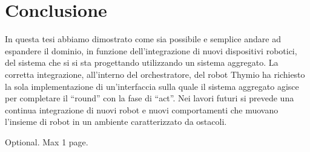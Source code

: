 \documentclass[12pt,a4paper,openright,twoside]{book}
\begin{document}
\chapter{Conclusione}
\label{chap:conclusione}

In questa tesi abbiamo dimostrato come sia possibile e semplice andare ad espandere il dominio, in funzione dell'integrazione di nuovi dispositivi robotici, del sistema che si si sta progettando utilizzando un sistema aggregato. La corretta integrazione, all'interno del orchestratore, del robot Thymio ha richiesto la sola implementazione di un'interfaccia sulla quale il sistema aggregato agisce per completare il ``round'' con la fase di ``act''. 
Nei lavori futuri si prevede una continua integrazione di nuovi robot e nuovi comportamenti che muovano l'insieme di robot in un ambiente caratterizzato da ostacoli. 


\backmatter




\begin{acknowledgements} %
Optional. Max 1 page.
\end{acknowledgements}
\end{document}
